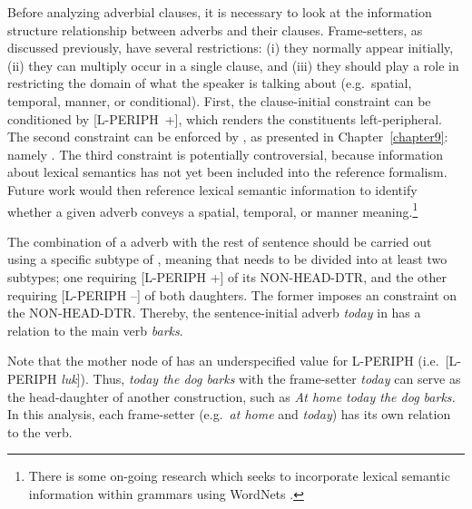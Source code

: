 Before analyzing adverbial clauses, it is
necessary to look at the information structure relationship between
adverbs and their clauses. Frame-setters, as
discussed previously, have several restrictions: (i) they normally
appear initially, (ii) they can multiply occur in a single clause, and
(iii) they should play a role in restricting the domain of what the
speaker is talking about (e.g.\ spatial, temporal, manner, or
conditional). First, the clause-initial constraint
can be conditioned by \mbox{[L-PERIPH +]}, which renders the
constituents left-peripheral. The second constraint can
be enforced by , as presented in
Chapter~\ref{chapter9}: namely  \vs
{}. The third constraint is
potentially controversial, because information about lexical semantics
has not yet been included into the  reference
formalism. Future work would then reference lexical semantic
information to identify whether a given adverb conveys a spatial,
temporal, or manner meaning.\footnote{There is some on-going research
  which seeks to incorporate lexical semantic information within
   grammars using WordNets
  \citep{bond:etal:09,pozen:13}.}




The combination of a  adverb with the rest of
sentence should be carried out using a specific subtype of
, meaning that  needs to be
divided into at least two subtypes; one requiring [L-PERIPH +] of its
NON-HEAD-DTR, and the other requiring [L-PERIPH --] of both
daughters. The former imposes an 
constraint on the NON-HEAD-DTR. Thereby, the sentence-initial adverb
\textit{today} in  has a  relation
to the main verb \textit{barks}.







\noindent Note that the mother node of  has an
underspecified value for L-PERIPH (i.e.\ [L-PERIPH
  \textit{luk}]). Thus, \textit{today the dog barks} with the
frame-setter \textit{today} can serve as the head-daughter of another
 construction, such as \textit{At home today the
  dog barks.} In this analysis, each frame-setter (e.g.\ \textit{at
  home} and \textit{today}) has its own  relation to the
verb.


